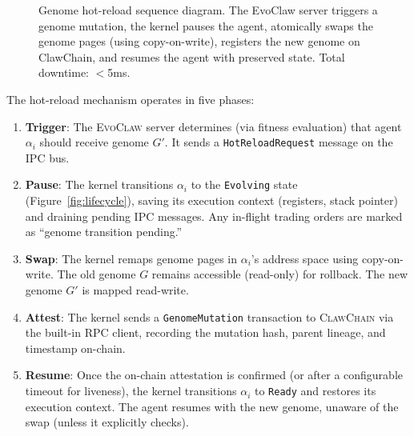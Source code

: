 \documentclass{article}
\newcommand{\evoclaw}{\textsc{EvoClaw}}
\newcommand{\clawchain}{\textsc{ClawChain}}
\begin{document}
\begin{figure}[t]
\caption{Genome hot-reload sequence diagram. The EvoClaw server triggers a genome mutation, the kernel pauses the agent, atomically swaps the genome pages (using copy-on-write), registers the new genome on ClawChain, and resumes the agent with preserved state. Total downtime: $<$5ms.}
\label{fig:hotreload}
\end{figure}

The hot-reload mechanism operates in five phases:

\begin{enumerate}[leftmargin=*]
    \item \textbf{Trigger}: The \evoclaw{} server determines (via fitness evaluation) that agent $\alpha_i$ should receive genome $G'$. It sends a \texttt{HotReloadRequest} message on the IPC bus.
    
    \item \textbf{Pause}: The kernel transitions $\alpha_i$ to the \texttt{Evolving} state (Figure~\ref{fig:lifecycle}), saving its execution context (registers, stack pointer) and draining pending IPC messages. Any in-flight trading orders are marked as ``genome transition pending.''
    
    \item \textbf{Swap}: The kernel remaps genome pages in $\alpha_i$'s address space using copy-on-write. The old genome $G$ remains accessible (read-only) for rollback. The new genome $G'$ is mapped read-write.
    
    \item \textbf{Attest}: The kernel sends a \texttt{GenomeMutation} transaction to \clawchain{} via the built-in RPC client, recording the mutation hash, parent lineage, and timestamp on-chain.
    
    \item \textbf{Resume}: Once the on-chain attestation is confirmed (or after a configurable timeout for liveness), the kernel transitions $\alpha_i$ to \texttt{Ready} and restores its execution context. The agent resumes with the new genome, unaware of the swap (unless it explicitly checks).
\end{enumerate}
\end{document}
